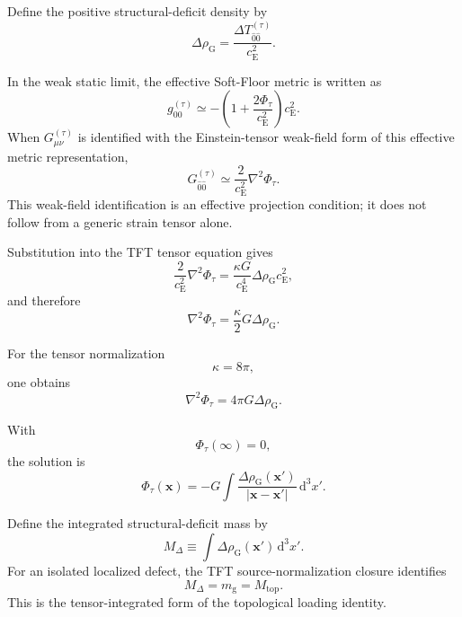 Define the positive structural-deficit density by
\begin{equation}
    \Delta\rho_{\mathrm{G}} = \frac{ \Delta T_{\hat{0}\hat{0}}^{(\tau)} }{ c_{\mathrm{E}}^2 }.
\end{equation}

In the weak static limit, the effective Soft-Floor metric is written as
\begin{equation}
    g_{00}^{(\tau)} \simeq -\left( 1+\frac{2\Phi_\tau}{c_{\mathrm{E}}^2} \right)c_{\mathrm{E}}^2.
\end{equation}
When $G_{\mu\nu}^{(\tau)}$ is identified with the Einstein-tensor weak-field form of this effective metric representation,
\begin{equation}
    G_{\hat{0}\hat{0}}^{(\tau)} \simeq \frac{2}{c_{\mathrm{E}}^2} \nabla^2\Phi_\tau.
\end{equation}
This weak-field identification is an effective projection condition; it does not follow from a generic strain tensor alone.

Substitution into the TFT tensor equation gives
\begin{equation}
    \frac{2}{c_{\mathrm{E}}^2} \nabla^2\Phi_\tau = \frac{\kappa G}{c_{\mathrm{E}}^4} \Delta\rho_{\mathrm{G}}c_{\mathrm{E}}^2,
\end{equation}
and therefore
\begin{equation}
    \nabla^2\Phi_\tau = \frac{\kappa}{2} G\Delta\rho_{\mathrm{G}}.
\end{equation}

For the tensor normalization
\begin{equation}
    \kappa=8\pi,
\end{equation}
one obtains
\begin{equation}
    \nabla^2\Phi_\tau = 4\pi G\Delta\rho_{\mathrm{G}}.
\end{equation}

With
\begin{equation}
    \Phi_\tau(\infty)=0,
\end{equation}
the solution is
\begin{equation}
    \Phi_\tau(\mathbf{x}) = -G \int \frac{ \Delta\rho_{\mathrm{G}}(\mathbf{x}') }{ |\mathbf{x}-\mathbf{x}'| } \,\mathrm{d}^3x'.
\end{equation}

Define the integrated structural-deficit mass by
\begin{equation}
    M_{\Delta} \equiv \int \Delta\rho_{\mathrm{G}}(\mathbf{x}') \,\mathrm{d}^3x'.
\end{equation}
For an isolated localized defect, the TFT source-normalization closure identifies
\begin{equation}
    M_{\Delta} = m_{\mathrm{g}} = M_{\mathrm{top}}.
\end{equation}
This is the tensor-integrated form of the topological loading identity.

